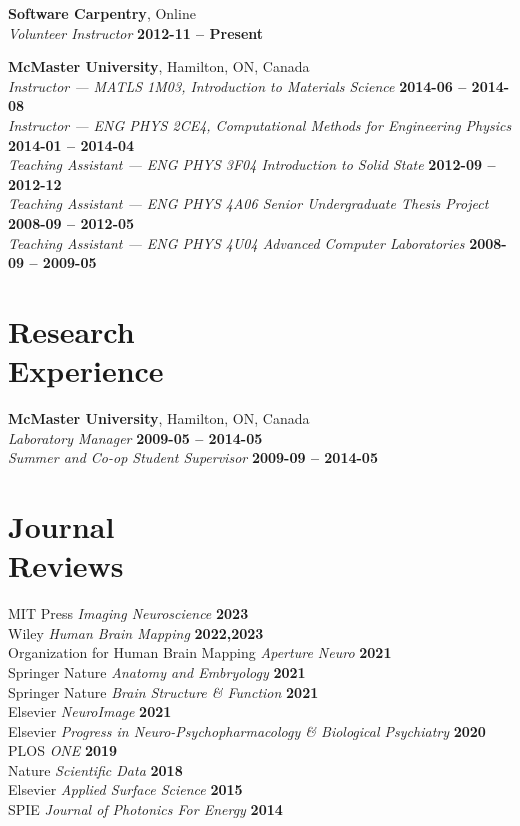 \documentclass[margin1,line,canadian]{resume}
\begin{document}
\begin{resume}
 \textbf{Software Carpentry}, Online\\%
 \textsl{Volunteer Instructor} \hfill \textbf{2012-11 -- Present}

 \vspace{-2mm}
 \textbf{McMaster University}, Hamilton, ON, Canada \\%
 \textsl{Instructor --- MATLS 1M03, Introduction to Materials Science} \hfill \textbf{2014-06 -- 2014-08}\\
 \textsl{Instructor --- ENG PHYS 2CE4, Computational Methods for Engineering Physics} \hfill \textbf{2014-01 -- 2014-04}\\
 \textsl{Teaching Assistant --- ENG PHYS 3F04 Introduction to Solid State} \hfill \textbf{2012-09 -- 2012-12}\\
 \textsl{Teaching Assistant --- ENG PHYS 4A06 Senior Undergraduate Thesis Project} \hfill  \textbf{2008-09 -- 2012-05}\\
 \textsl{Teaching Assistant --- ENG PHYS 4U04 Advanced Computer Laboratories} \hfill \textbf{2008-09 -- 2009-05}

 \section{\mysidestyle{}Research\\Experience}
 \textbf{McMaster University}, Hamilton, ON, Canada\\%
 \textsl{Laboratory Manager} \hfill \textbf{2009-05 -- 2014-05}\\
 \textsl{Summer and Co-op Student Supervisor} \hfill \textbf{2009-09 -- 2014-05}\\

\section{\mysidestyle{}Journal\\Reviews}
MIT Press \textsl{Imaging Neuroscience} \hfill \textbf{2023}\\
Wiley \textsl{Human Brain Mapping} \hfill \textbf{2022,2023}\\
Organization for Human Brain Mapping \textsl{Aperture Neuro} \hfill \textbf{2021}\\
Springer Nature \textsl{Anatomy and Embryology} \hfill \textbf{2021}\\
Springer Nature \textsl{Brain Structure \& Function} \hfill \textbf{2021}\\
Elsevier \textsl{NeuroImage} \hfill \textbf{2021}\\
Elsevier \textsl{Progress in Neuro-Psychopharmacology \& Biological Psychiatry} \hfill \textbf{2020}\\
PLOS \textsl{ONE} \hfill \textbf{2019}\\
Nature \textsl{Scientific Data} \hfill \textbf{2018}\\
Elsevier \textsl{Applied Surface Science} \hfill \textbf{2015}\\
SPIE \textsl{Journal of Photonics For Energy} \hfill \textbf{2014}


\end{resume}
\end{document}
